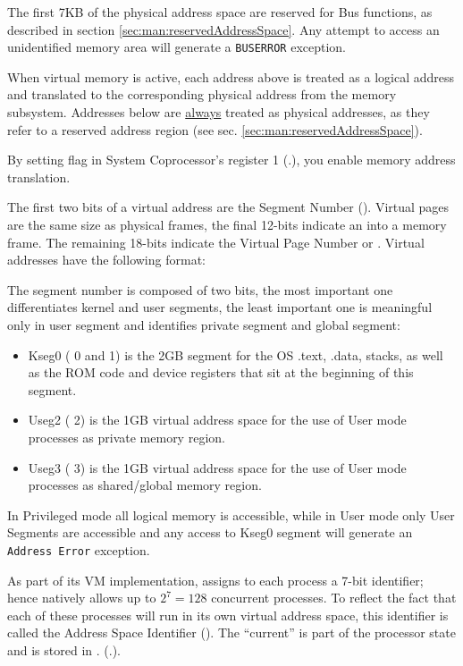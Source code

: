 The first 7KB of the physical address space are reserved for Bus functions, as described in section \ref{sec:man:reservedAddressSpace}. Any attempt to access an unidentified memory area will generate a \texttt{BUSERROR} exception.

\label{sec:man:virtualMemory}
When virtual memory is active, each address above  is treated as a logical address and translated to the corresponding physical address from the memory subsystem.
Addresses below  are \uline{always} treated as physical addresses, as they refer to a reserved address region (see sec. \ref{sec:man:reservedAddressSpace}).

By setting  flag in System Coprocessor's register 1 (.), you enable memory address translation.

The first two bits of a virtual address are the Segment Number ().
Virtual pages are the same size as physical frames, the final 12-bits indicate an  into a memory frame.
The remaining 18-bits indicate the Virtual Page Number or . 
Virtual addresses have the following format:


The segment number is composed of two bits, the most important one differentiates kernel and user segments, the least important one is meaningful only in user segment and identifies private segment and global segment:
\begin{itemize}
	\item Kseg0 ( 0 and 1) is the 2GB segment for the OS .text, .data, stacks, as well as the ROM code and device registers that sit at the beginning of this segment.
	\item Useg2 ( 2) is the 1GB virtual address space for the use of User mode processes as private memory region.
	\item Useg3 ( 3) is the 1GB virtual address space for the use of User mode processes as shared/global memory region.
\end{itemize}

In Privileged mode all logical memory is accessible, while in User mode only User Segments are accessible and any access to Kseg0 segment will generate an \texttt{Address Error} exception.


As part of its VM implementation, \uarm{} assigns to each process a 7-bit identifier; hence \uarm{} natively allows up to $2^7 = 128$ concurrent processes. To reflect the fact that each of these processes will run in its own virtual address space, this identifier is called the Address Space Identifier (). The “current”  is part of the processor state and is stored in . (.).


